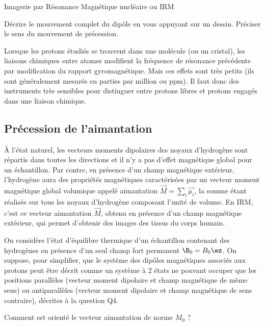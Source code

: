 \begin{exo}[PC][1][devoir]{Imagerie par Résonance Magnétique nucléaire ou IRM}
\begin{quest}
		\item Décrire le mouvement complet du dipôle en vous appuyant sur un dessin. Préciser le sens du mouvement de précession.

	\end{quest}
		Lorsque les protons étudiés se trouvent dans une molécule (ou un cristal), les liaisons chimiques entre atomes modifient la fréquence de résonance précédente par modification du rapport gyromagnétique. Mais ces effets sont très petits (ils sont généralement mesurés en parties par million ou ppm). Il faut donc des instruments très sensibles pour distinguer entre protons libres et protons engagés dans une liaison chimique.

		\subsection{Précession de l'aimantation}
		À l'état naturel, les vecteurs moments dipolaires des noyaux d'hydrogène sont répartis dans toutes les directions et il n'y a pas d'effet magnétique global pour un échantillon. Par contre, en présence d'un champ magnétique extérieur, l'hydrogène aura des propriétés magnétiques caractérisées par un vecteur moment magnétique global volumique appelé aimantation $\Vec{M}=\sum_{\mathrm{i}} \Vec{\mu_{i}}$, la somme étant réalisée sur tous les noyaux d'hydrogène composant l'unité de volume. En IRM, c'est ce vecteur aimantation $\vec{M}$, obtenu en présence d'un champ magnétique extérieur, qui permet d'obtenir des images des tissus du corps humain.

		On considère l'état d'équilibre thermique d'un échantillon contenant des hydrogènes en présence d'un seul champ fort permanent $\B_0=B_0 \ez$. On suppose, pour simplifier, que le système des dipôles magnétiques associés aux protons peut être décrit comme un système à 2 états ne pouvant occuper que les positions parallèles (vecteur moment dipolaire et champ magnétique de même sens) ou antiparallèles (vecteur moment dipolaire et champ magnétique de sens contraire), décrites à la question Q4.
		\begin{quest}
			\item Comment est orienté le vecteur aimantation de norme ${M}_{0}$ ?


\end{quest}
\end{exo}
